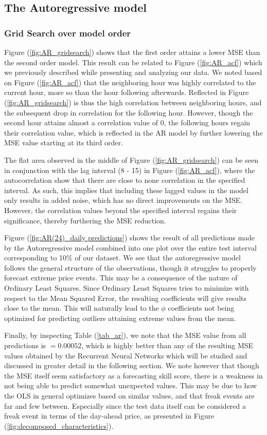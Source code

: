 \documentclass
[twocolumn,
secnumarabic,
nobibnotes,
aps,
prl,
reprint,
groupedaddress,
amsmath,
amssymb,
]{revtex4-2}
\begin{document}
\subsection{The Autoregressive model}

\subsubsection{Grid Search over model order}
Figure (\ref{fig:AR_gridsearch}) shows that the first order attains a lower MSE than the second order model. This result can be related to Figure (\ref{fig:AR_acf}) which we previously described while presenting and analyzing our data. We noted based on Figure (\ref{fig:AR_acf}) that the neighboring hour was highly correlated to the current hour, more so than the hour following afterwards. Reflected in Figure (\ref{fig:AR_gridsearch}) is thus the high correlation between neighboring hours, and the subsequent drop in correlation for the following hour. However, though the second hour attains almost a correlation value of $0$, the following hours regain their correlation value, which is reflected in the AR model by further lowering the MSE value starting at its third order.

The flat area observed in the middle of Figure (\ref{fig:AR_gridsearch}) can be seen in conjunction with the lag interval (8 - 15) in Figure (\ref{fig:AR_acf}), where the autocorrelation show that there are close to none correlation in the specified interval. As such, this implies that including these lagged values in the model only results in added noise, which has no direct improvements on the MSE. However, the correlation values beyond the specified interval regains their significance, thereby furthering the MSE reduction.

Figure (\ref{fig:AR(24)_daily predictions}) shows the result of all predictions made by the Autoregressive model combined into one plot over the entire test interval corresponding to 10\% of our dataset. We see that the autoregressive model follows the general structure of the observations, though it struggles to properly forecast extreme price events. This may be a consequence of the nature of Ordinary Least Squares. Since Ordinary Least Squares tries to minimize with respect to the Mean Squared Error, the resulting coefficients will give results close to the mean. This will naturally lead to the $\phi$ coefficients not being optimized for predicting outliers attaining extreme values from the mean.

Finally, by inspecting Table (\ref{tab_ar}), we note that the MSE value from all predictions is $=0.00052$, which is highly better than any of the resulting MSE values obtained by the Recurrent Neural Networks which will be studied and discussed in greater detail in the following section. We note however that though the MSE itself seem satisfactory as a forecasting skill score, there is a weakness in not being able to predict somewhat unexpected values. This may be due to how the OLS in general optimizes based on similar values, and that freak events are far and few between. Especially since the test data itself can be considered a freak event in terms of the day-ahead price, as presented in Figure (\ref{fig:decomposed_characteristics}).
\end{document}
